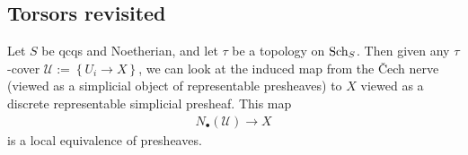 \documentclass[11pt,openany]{book}
\begin{document}



\subsection{Torsors revisited}

\begin{proposition} Let $S$ be qcqs and Noetherian, and let $\tau$ be a topology on $\mathrm{Sch}_S$. Then given any $\tau$-cover $\mathcal{U}:=\left\{ U_i \to X \right\}$, we can look at the induced map from the \v{C}ech nerve (viewed as a simplicial object of representable presheaves) to $X$ viewed as a discrete representable simplicial presheaf. This map
\begin{align*}
    N_\bullet(\mathcal{U}) \to X
\end{align*}
is a local equivalence of presheaves.
\end{proposition}
\end{document}
